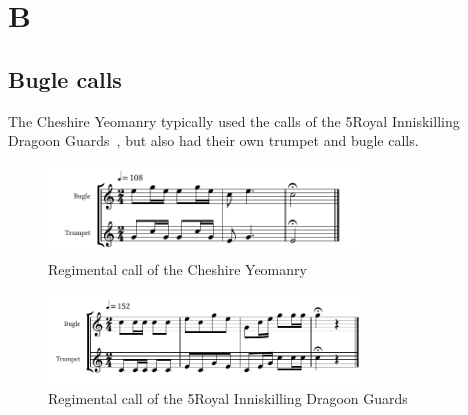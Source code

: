 \chapter*{B}

\section*{Bugle calls}

The Cheshire Yeomanry typically used the calls of the 5\nth Royal Inniskilling Dragoon Guards~\cite[p11]{trumpet-and-bugle-calls}, but also had their own trumpet and bugle calls.

\begin{figure}[h]
  \centering
  \includegraphics[width=0.75\textwidth]{gazette/cheshire-yeomanry-call.pdf}
  \caption*{Regimental call of the Cheshire Yeomanry~\cite[p11]{trumpet-and-bugle-calls}}
\end{figure}

\begin{figure}[h]
  \centering
  \includegraphics[width=0.75\textwidth]{gazette/5ridg-call.pdf}
  \caption*{Regimental call of the 5\nth Royal Inniskilling Dragoon Guards~\cite[p3]{trumpet-and-bugle-calls}}
\end{figure}
